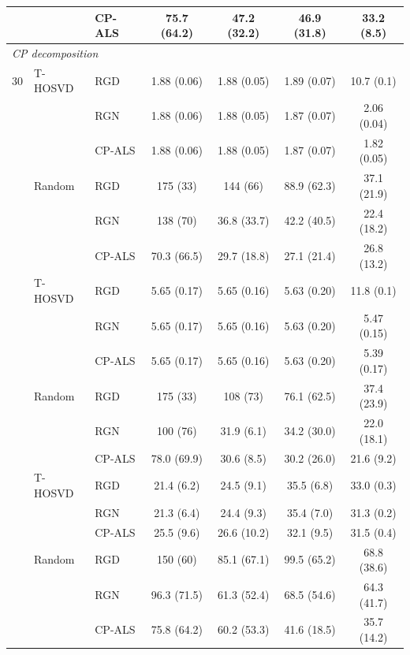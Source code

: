 \begin{table}[!htbp]
{\begin{tabular}{lllcccc}
 &  & CP-ALS & 75.7 (64.2) & 47.2 (32.2) & 46.9 (31.8) & 33.2 (8.5) \\
\midrule
\multicolumn{7}{l}{\emph{CP decomposition}} \\
30 & T-HOSVD & RGD & 1.88 (0.06) & 1.88 (0.05) & 1.89 (0.07) & 10.7 (0.1) \\
 &  & RGN & 1.88 (0.06) & 1.88 (0.05) & 1.87 (0.07) & 2.06 (0.04) \\
 &  & CP-ALS & 1.88 (0.06) & 1.88 (0.05) & 1.87 (0.07) & 1.82 (0.05) \\
 & Random & RGD & 175 (33) & 144 (66) & 88.9 (62.3) & 37.1 (21.9) \\
 &  & RGN & 138 (70) & 36.8 (33.7) & 42.2 (40.5) & 22.4 (18.2) \\
 &  & CP-ALS & 70.3 (66.5) & 29.7 (18.8) & 27.1 (21.4) & 26.8 (13.2) \\
\addlinespace
10 & T-HOSVD & RGD & 5.65 (0.17) & 5.65 (0.16) & 5.63 (0.20) & 11.8 (0.1) \\
 &  & RGN & 5.65 (0.17) & 5.65 (0.16) & 5.63 (0.20) & 5.47 (0.15) \\
 &  & CP-ALS & 5.65 (0.17) & 5.65 (0.16) & 5.63 (0.20) & 5.39 (0.17) \\
 & Random & RGD & 175 (33) & 108 (73) & 76.1 (62.5) & 37.4 (23.9) \\
 &  & RGN & 100 (76) & 31.9 (6.1) & 34.2 (30.0) & 22.0 (18.1) \\
 &  & CP-ALS & 78.0 (69.9) & 30.6 (8.5) & 30.2 (26.0) & 21.6 (9.2) \\
\addlinespace
3 & T-HOSVD & RGD & 21.4 (6.2) & 24.5 (9.1) & 35.5 (6.8) & 33.0 (0.3) \\
 &  & RGN & 21.3 (6.4) & 24.4 (9.3) & 35.4 (7.0) & 31.3 (0.2) \\
 &  & CP-ALS & 25.5 (9.6) & 26.6 (10.2) & 32.1 (9.5) & 31.5 (0.4) \\
 & Random & RGD & 150 (60) & 85.1 (67.1) & 99.5 (65.2) & 68.8 (38.6) \\
 &  & RGN & 96.3 (71.5) & 61.3 (52.4) & 68.5 (54.6) & 64.3 (41.7) \\
 &  & CP-ALS & 75.8 (64.2) & 60.2 (53.3) & 41.6 (18.5) & 35.7 (14.2) \\
\bottomrule
\end{tabular}}
\end{table}
